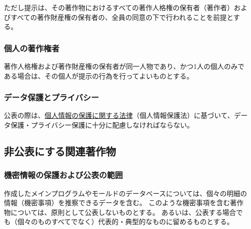 ただし提示は、その著作物におけるすべての著作人格権の保有者（著作者）およびすべての著作財産権の保有者の、全員の同意の下で行われることを前提とする。


\subsubsection{個人の著作権者\label{subsec:individualholder}}
著作人格権および著作財産権の保有者が同一人物であり、かつ1人の個人のみである場合は、その個人が提示の行為を行ってよいものとする。

\subsubsection{データ保護とプライバシー}
公表の際は、\href{https://elaws.e-gov.go.jp/document?lawid=415AC0000000057}{個人情報の保護に関する法律}（個人情報保護法）\cite{eGovPersonalInfoProtectionLaw}に基づいて、データ保護・プライバシー保護に十分に配慮しなければならない。


\subsection{非公表にする関連著作物}

\subsubsection{機密情報の保護および公表の範囲\label{subsec:notopenwork}}
作成したメインプログラムやモールドのデータベースについては、個々の明細の情報（機密事項）を推察できるデータを含む。
このような機密事項を含む著作物については、原則として公表しないものとする。
あるいは、公表する場合でも（個々のものすべてでなく）代表的・典型的なものに留めるものとする。

